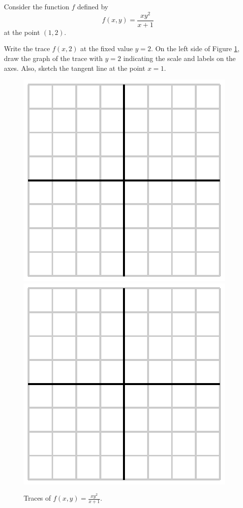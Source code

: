  \begin{activity} \label{A:10.2.10} Consider the function $f$ defined by 
   $$
   f(x,y) = \frac{xy^2}{x+1}
   $$
   at the point $(1,2)$.

   \ba
   \item Write the trace $f(x,2)$ at the fixed value $y=2$.   
     On the left side of Figure \ref{F:10.2.activity.trace},
     draw the graph of the trace with $y=2$ indicating the scale and
     labels on the axes.  Also, sketch 
     the tangent line at the point $x=1$.

   \begin{figure}[ht]
     \begin{center}
       \includegraphics{figures/fig_10_2_empty.eps}
       \hspace*{0.5in}
       \includegraphics{figures/fig_10_2_empty.eps}
     \end{center}
     \caption{Traces of $f(x,y) = \frac{xy^2}{x+1}$.}
     \label{F:10.2.activity.trace}
   \end{figure}


\end{activity}
